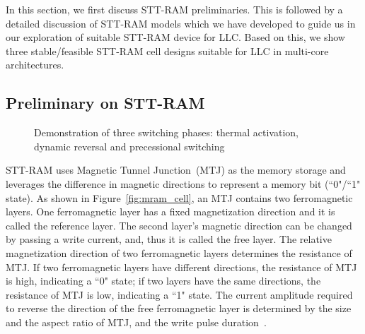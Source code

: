 In this section, we first discuss STT-RAM preliminaries. This is followed by a detailed discussion of
STT-RAM models which we have developed to guide us in our exploration of suitable STT-RAM device for
LLC. Based on this, we show three stable/feasible STT-RAM cell designs
suitable for LLC in multi-core architectures.
\subsection{Preliminary on STT-RAM}
\begin{figure*} [t]
\centering
\begin{minipage}{0.575\textwidth}
\centering
 \caption{\label{fig:mram_cell} (a) Structural view of an STT-RAM Cache Cell
 (b) Anti-Parallel High Resistance, Indicating ``0" state (c) Parallel Low Resistance, Indicating ``1" state}
\end{minipage}
\hfill
\begin{minipage}{0.375\textwidth}
\centering
 \caption{\label{fig:IcWt} Demonstration of three switching phases:
 thermal activation, dynamic reversal and precessional switching }
\end{minipage}
\end{figure*}

STT-RAM uses Magnetic Tunnel Junction~(MTJ) as the memory storage and leverages the difference in
magnetic directions to represent a memory bit (``0"/``1" state). As shown in
Figure~\ref{fig:mram_cell}, an MTJ contains two ferromagnetic layers. One ferromagnetic layer has a
fixed magnetization direction and it is called the reference layer. The second layer's magnetic
direction can be changed by passing a write current, and, thus it is called the free layer. The
relative magnetization direction of two ferromagnetic layers determines the resistance of MTJ.  If
two ferromagnetic layers have different directions, the resistance of MTJ is high, indicating a ``0"
state; if two layers have the same directions, the resistance of MTJ is low, indicating a ``1"
state. The current amplitude required to reverse the
direction of the free ferromagnetic layer is determined by the size and the aspect ratio of MTJ, and
the write pulse duration~\cite{STTRAM:JAP07, STTRAM:Qualcomm09}.

